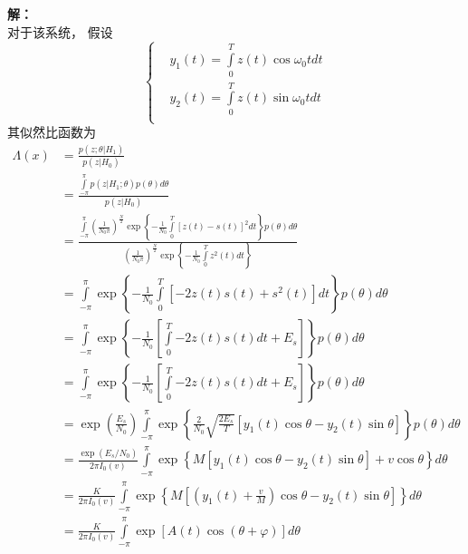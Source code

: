 \documentclass{article}
\begin{document}
\begin{enumerate}[1.]
\textbf{解：}\\
对于该系统， 假设\[\left\{ \begin{aligned}
  & {{y}_{1}}(t)=\int\limits_{0}^{T}{z(t)\cos {{\omega }_{0}}t}dt \\ 
 & {{y}_{2}}(t)=\int\limits_{0}^{T}{z(t)\sin {{\omega }_{0}}t}dt \\ 
\end{aligned} \right.\]
其似然比函数为\[\begin{aligned}
 \Lambda (x)
 &=\frac{p(z;\theta |{{H}_{1}})}{p(z|{{H}_{0}})} \\ 
 & =\frac{\int\limits_{-\pi }^{\pi }{p(z|{{H}_{1}};\theta )p(\theta )}d\theta }{p(z|{{H}_{0}})} \\ 
 & =\frac{\int\limits_{-\pi }^{\pi }{{{\left( \frac{1}{{{N}_{0}}\pi } \right)}^{\frac{N}{2}}}\exp \left\{ -\frac{1}{{{N}_{0}}}\int\limits_{0}^{T}{{{\left[ z(t)-s(t) \right]}^{2}}}dt \right\}p(\theta )}d\theta }{{{\left( \frac{1}{{{N}_{0}}\pi } \right)}^{\frac{N}{2}}}\exp \left\{ -\frac{1}{{{N}_{0}}}\int\limits_{0}^{T}{{{z}^{2}}(t)}dt \right\}} \\ 
 & =\int\limits_{-\pi }^{\pi }{\exp \left\{ -\frac{1}{{{N}_{0}}}\int\limits_{0}^{T}{\left[ -2z(t)s(t)+{{s}^{2}}(t) \right]}dt \right\}p(\theta )}d\theta  \\ 
 & =\int\limits_{-\pi }^{\pi }{\exp \left\{ -\frac{1}{{{N}_{0}}}\left[ \int\limits_{0}^{T}{-2z(t)s(t)}dt+{{E}_{s}} \right] \right\}p(\theta )}d\theta  \\ 
 & =\int\limits_{-\pi }^{\pi }{\exp \left\{ -\frac{1}{{{N}_{0}}}\left[ \int\limits_{0}^{T}{-2z(t)s(t)}dt+{{E}_{s}} \right] \right\}p(\theta )}d\theta  \\ 
 & =\exp \left( \frac{{{E}_{s}}}{{{N}_{0}}} \right)\int\limits_{-\pi }^{\pi }{\exp \left\{ \frac{2}{{{N}_{0}}}\sqrt{\frac{2{{E}_{s}}}{T}}\left[ {{y}_{1}}(t)\cos \theta -{{y}_{2}}(t)\sin \theta  \right] \right\}p(\theta )}d\theta  \\ 
 & =\frac{\exp ({{E}_{s}}/{{N}_{0}})}{2\pi {{I}_{0}}(v)}\int\limits_{-\pi }^{\pi }{\exp \left\{ M\left[ {{y}_{1}}(t)\cos \theta -{{y}_{2}}(t)\sin \theta  \right]+v\cos \theta  \right\}}d\theta  \\ 
 & =\frac{K}{2\pi {{I}_{0}}(v)}\int\limits_{-\pi }^{\pi }{\exp \left\{ M\left[ \left( {{y}_{1}}(t)+\frac{v}{M} \right)\cos \theta -{{y}_{2}}(t)\sin \theta  \right] \right\}}d\theta  \\ 
 & =\frac{K}{2\pi {{I}_{0}}(v)}\int\limits_{-\pi }^{\pi }{\exp \left[ A(t)\cos (\theta +\varphi ) \right]}d\theta  \\ 

\end{aligned}\]
\end{enumerate}
\end{document}
